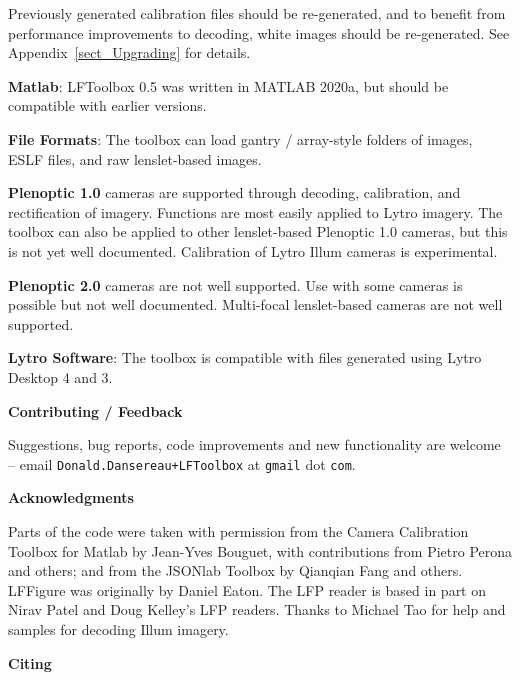 \documentclass[onecolumn]{article}
\newcommand{\SymbolText}[1]{\texttt{\small #1}}
\begin{document}
Previously generated calibration files should be re-generated, and to benefit from performance improvements to decoding, white images should be re-generated.  See Appendix~\ref{sect_Upgrading} for details.

\textbf{Matlab}: LFToolbox 0.5 was written in MATLAB 2020a, but should be compatible with earlier versions.

\textbf{File Formats}: The toolbox can load gantry / array-style folders of images, ESLF files, and raw lenslet-based images.

\textbf{Plenoptic 1.0} cameras are supported through decoding, calibration, and rectification of imagery. Functions are most easily applied to Lytro imagery. The toolbox can also be applied to other lenslet-based Plenoptic 1.0 cameras, but this is not yet well documented. Calibration of Lytro Illum cameras is experimental.

\textbf{Plenoptic 2.0} cameras are not well supported. Use with some cameras is possible but not well documented. Multi-focal lenslet-based cameras are not well supported.

\textbf{Lytro Software}: The toolbox is compatible with files generated using Lytro Desktop 4 and 3.

\vspace{1em}\noindent\textbf{\large{Contributing / Feedback}}\vspace{0.5em}

Suggestions, bug reports, code improvements and new functionality are welcome -- email \SymbolText{Donald.Dansereau+LFToolbox} \small{at} \SymbolText{gmail} \small{dot} \SymbolText{com}.

\vspace{1em}\noindent\textbf{\large{Acknowledgments}}\vspace{0.5em}

Parts of the code were taken with permission from the Camera Calibration Toolbox for Matlab by Jean-Yves Bouguet, with contributions from Pietro Perona and others; and from the JSONlab Toolbox by Qianqian Fang and others. LFFigure was originally by Daniel Eaton. The LFP reader is based in part on Nirav Patel and Doug Kelley's LFP readers. Thanks to Michael Tao for help and samples for decoding Illum imagery.

\vspace{1em}\noindent\textbf{\large{Citing}}\vspace{0.5em}
\end{document}
